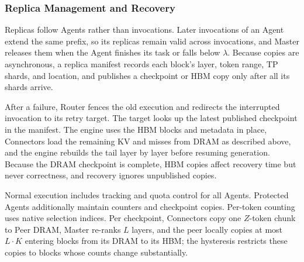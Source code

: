 \subsubsection{Replica Management and Recovery}
\label{sec:master-online}
\label{sec:execution}

Replicas follow Agents rather than invocations. Later invocations of an
Agent extend the same prefix, so its replicas remain valid across
invocations, and Master releases them when the Agent finishes its task or
falls below $\lambda$. Because copies are asynchronous, a replica manifest
records each block's layer, token range, TP shards, and location, and
publishes a checkpoint or HBM copy only after all its shards arrive.

After a failure, Router fences the old execution and redirects the
interrupted invocation to its retry target. The target looks up the
latest published checkpoint in the manifest. The engine uses the HBM
blocks and metadata in place, Connectors load the remaining KV and misses
from DRAM as described above, and the engine rebuilds the tail layer by
layer before resuming generation. Because the DRAM checkpoint is complete,
HBM copies affect recovery time but never correctness, and recovery
ignores unpublished copies.

Normal execution includes tracking and quota control for all Agents.
Protected Agents additionally maintain counters and checkpoint copies.
Per-token counting uses native selection indices. Per checkpoint, Connectors copy one $Z$-token chunk
to Peer DRAM, Master re-ranks $L$ layers, and the peer locally copies at
most $L\cdot K$ entering blocks from its DRAM to its HBM; the hysteresis
restricts these copies to blocks whose counts change substantially.

